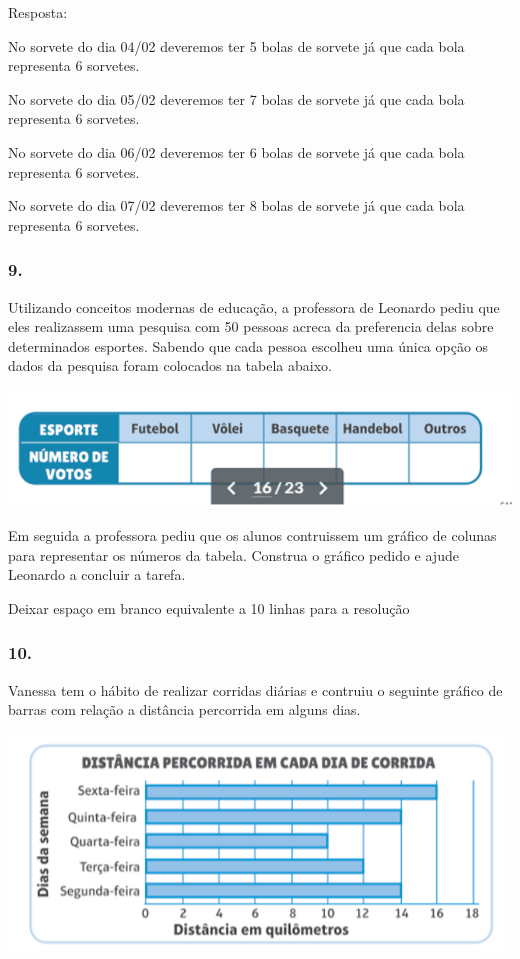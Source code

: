 Resposta:

No sorvete do dia 04/02 deveremos ter 5 bolas de sorvete já que cada
bola representa 6 sorvetes.

No sorvete do dia 05/02 deveremos ter 7 bolas de sorvete já que cada
bola representa 6 sorvetes.

No sorvete do dia 06/02 deveremos ter 6 bolas de sorvete já que cada
bola representa 6 sorvetes.

No sorvete do dia 07/02 deveremos ter 8 bolas de sorvete já que cada
bola representa 6 sorvetes.

\subsubsection{9.}\label{section-99}

Utilizando conceitos modernas de educação, a professora de Leonardo
pediu que eles realizassem uma pesquisa com 50 pessoas acreca da
preferencia delas sobre determinados esportes. Sabendo que cada pessoa
escolheu uma única opção os dados da pesquisa foram colocados na tabela
abaixo.

\includegraphics[width=5.39213in,height=1.22511in]{media/image102.png}

Em seguida a professora pediu que os alunos contruissem um gráfico de
colunas para representar os números da tabela. Construa o gráfico pedido
e ajude Leonardo a concluir a tarefa.

Deixar espaço em branco equivalente a 10 linhas para a resolução

\subsubsection{10.}\label{section-100}

Vanessa tem o hábito de realizar corridas diárias e contruiu o seguinte
gráfico de barras com relação a distância percorrida em alguns dias.

\includegraphics[width=5.22545in,height=2.25853in]{media/image103.png}

